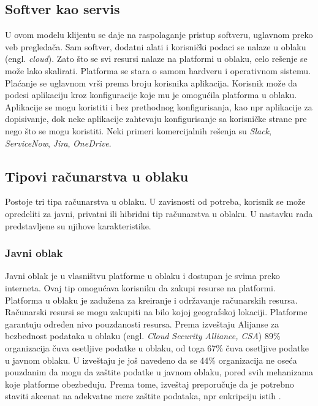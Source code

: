 \documentclass[12pt,oneside]{memoir}
\begin{document}
\subsection{Softver kao servis}
U ovom modelu klijentu se daje na raspolaganje pristup softveru, uglavnom preko veb pregledača. Sam softver, dodatni alati i korisnički podaci se nalaze u oblaku (engl. \emph{cloud}). Zato što se svi resursi nalaze na platformi u oblaku, celo rešenje se može lako skalirati. Platforma se stara o samom hardveru i operativnom sistemu. Plaćanje se uglavnom vrši prema broju korisnika aplikacija. Korisnik može da podesi aplikaciju kroz konfiguracije koje mu je omogućila platforma u oblaku. Aplikacije se mogu koristiti i bez prethodnog konfigurisanja, kao npr aplikacije za dopisivanje, dok neke aplikacije zahtevaju konfigurisanje sa korisničke strane pre nego što se mogu koristiti. Neki primeri komercijalnih rešenja su \emph{Slack}, \emph{ServiceNow}, \emph{Jira}, \emph{OneDrive}. 


\subsection{Tipovi računarstva u oblaku}

Postoje tri tipa računarstva u oblaku. U zavisnosti od potreba, korisnik se može opredeliti za javni, privatni ili hibridni tip računarstva u oblaku. U nastavku rada predstavljene su njihove karakteristike.


\subsubsection{Javni oblak} 
Javni oblak je u vlasništvu platforme u oblaku i dostupan je svima preko interneta. Ovaj tip omogućava korisniku da zakupi resurse na platformi. Platforma u oblaku je zadužena za kreiranje i održavanje računarskih resursa. Računarski resursi se mogu zakupiti na bilo kojoj geografskoj lokaciji. Platforme garantuju određen nivo pouzdanosti resursa. Prema izveštaju Alijanse za bezbednost podataka u oblaku (engl. \emph{Cloud Security Alliance, CSA}) 89\% organizacija čuva osetljive podatke u oblaku, od toga 67\% čuva osetljive podatke u javnom oblaku. U izveštaju je još navedeno da se 44\% organizacija ne oseća pouzdanim da mogu da zaštite podatke u javnom oblaku, pored svih mehanizama koje platforme obezbeđuju. Prema tome, izveštaj preporučuje da je potrebno staviti akcenat na adekvatne mere zaštite podataka, npr enkripciju istih \cite{csa}.
\end{document}
